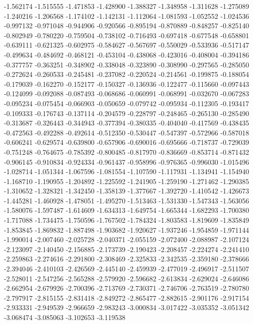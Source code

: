 -1.562174
-1.515555
-1.471853
-1.428900
-1.388327
-1.348958
-1.311628
-1.275089
-1.240216
-1.206568
-1.174102
-1.142131
-1.112064
-1.081593
-1.052552
-1.024536
-0.997132
-0.971048
-0.944906
-0.920566
-0.895194
-0.870889
-0.848257
-0.825140
-0.802949
-0.780220
-0.759504
-0.738102
-0.716493
-0.697418
-0.677548
-0.658801
-0.639111
-0.621325
-0.602975
-0.584627
-0.567697
-0.550029
-0.533936
-0.517147
-0.499634
-0.484692
-0.468121
-0.453104
-0.438068
-0.423016
-0.408004
-0.394186
-0.377757
-0.363251
-0.348902
-0.338048
-0.323890
-0.308990
-0.297565
-0.285050
-0.272624
-0.260533
-0.245481
-0.237082
-0.220524
-0.214561
-0.199875
-0.188054
-0.179039
-0.162270
-0.152177
-0.150327
-0.136936
-0.122477
-0.115660
-0.097443
-0.124099
-0.092088
-0.087493
-0.068686
-0.060991
-0.068991
-0.032670
-0.067283
-0.095234
-0.075454
-0.066903
-0.050659
-0.079742
-0.095934
-0.112305
-0.193417
-0.109333
-0.176743
-0.137114
-0.204579
-0.228797
-0.248465
-0.265130
-0.285490
-0.313687
-0.326443
-0.344943
-0.377394
-0.380335
-0.404040
-0.417569
-0.438435
-0.472563
-0.492288
-0.492614
-0.512350
-0.530447
-0.547397
-0.572966
-0.587018
-0.606241
-0.629574
-0.639800
-0.657906
-0.690016
-0.695666
-0.718737
-0.729039
-0.751248
-0.764675
-0.785392
-0.800485
-0.817970
-0.836669
-0.853714
-0.871432
-0.906145
-0.910834
-0.924334
-0.961437
-0.958996
-0.976365
-0.996030
-1.015496
-1.028714
-1.051344
-1.067596
-1.081554
-1.107590
-1.117931
-1.134941
-1.154940
-1.168710
-1.190955
-1.204892
-1.225592
-1.241905
-1.259190
-1.271462
-1.290385
-1.310652
-1.328321
-1.342450
-1.358139
-1.377667
-1.392720
-1.410542
-1.426673
-1.445281
-1.460928
-1.478051
-1.495270
-1.513463
-1.531330
-1.547343
-1.563056
-1.580076
-1.597487
-1.614609
-1.634313
-1.649754
-1.665344
-1.682293
-1.700380
-1.717088
-1.734475
-1.750596
-1.767502
-1.784324
-1.803583
-1.819609
-1.835849
-1.853845
-1.869832
-1.887498
-1.903682
-1.920627
-1.937246
-1.954859
-1.971144
-1.990014
-2.007460
-2.025728
-2.040371
-2.055159
-2.072400
-2.088987
-2.107124
-2.123097
-2.140450
-2.156885
-2.173739
-2.190423
-2.208457
-2.224274
-2.241410
-2.259863
-2.274616
-2.291800
-2.308469
-2.325833
-2.342535
-2.359180
-2.378666
-2.394046
-2.410103
-2.426569
-2.445140
-2.459939
-2.477019
-2.496917
-2.511507
-2.528011
-2.547256
-2.565288
-2.579920
-2.596682
-2.613834
-2.629024
-2.646086
-2.662954
-2.679926
-2.700396
-2.713769
-2.730371
-2.746706
-2.763519
-2.780780
-2.797917
-2.815155
-2.831418
-2.849272
-2.865477
-2.882615
-2.901176
-2.917154
-2.933331
-2.949539
-2.966659
-2.983243
-3.000834
-3.017422
-3.035352
-3.051342
-3.068474
-3.085063
-3.102653
-3.119538
